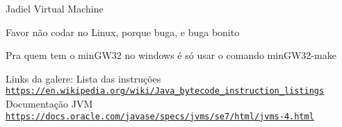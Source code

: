 Jadiel Virtual Machine

Favor não codar no Linux, porque buga, e buga bonito

Pra quem tem o min\+G\+W32 no windows é só usar o comando min\+G\+W32-\/make

Links da galere\+: Lista das instruções \href{https://en.wikipedia.org/wiki/Java_bytecode_instruction_listings}{\tt https\+://en.\+wikipedia.\+org/wiki/\+Java\+\_\+bytecode\+\_\+instruction\+\_\+listings} Documentação J\+VM \href{https://docs.oracle.com/javase/specs/jvms/se7/html/jvms-4.html}{\tt https\+://docs.\+oracle.\+com/javase/specs/jvms/se7/html/jvms-\/4.\+html} 